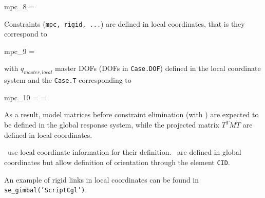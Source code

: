 \begin{eqsvg}{mpc_8}
   =  
\end{eqsvg}

Constraints ({\tt mpc, rigid, ...}) are defined in local coordinates, that is they correspond to
%
\begin{eqsvg}{mpc_9}
   =  
\end{eqsvg}
%
with $q_{master,local}$ master DOFs (DOFs in {\tt Case.DOF}) defined in the local coordinate system and the {\tt Case.T} corresponding to
%
\begin{eqsvg}{mpc_10}
    =  =  
\end{eqsvg}
%
As a result, model matrices before constraint elimination (with ) are expected to be defined in the global response system, while the projected matrix $T^TMT$ are defined in local coordinates. 

\celas\ use local coordinate information for their definition. \cbush\ are defined in global coordinates but allow definition of orientation through the element {\tt CID}. 

An example of rigid links in local coordinates can be found in {\tt se\_gimbal('ScriptCgl')}.\\


